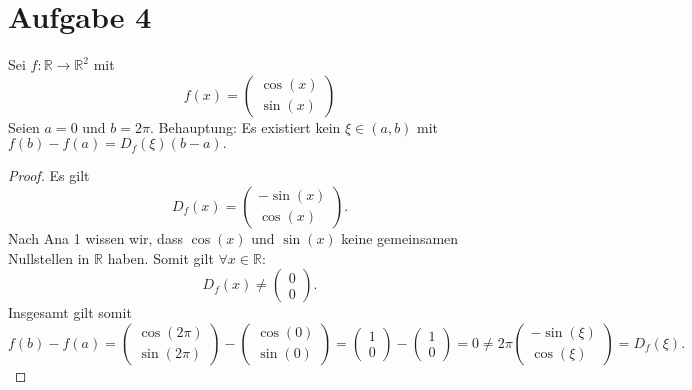 \documentclass{article}
\theoremstyle{definition}
\newcommand{\R}{\mathbb{R}}
\begin{document}
\section*{Aufgabe 4}
Sei $f:\R\longrightarrow \R^2$ mit 
$$f(x)=\begin{pmatrix}
	\cos(x)\\
	\sin(x)
\end{pmatrix}$$
Seien $a=0$ und $b=2\pi.$\newline
Behauptung: Es existiert kein $\xi \in (a,b)$ mit $f(b)-f(a)=D_f(\xi)(b-a).$
\begin{proof}
	Es gilt 
	$$ D_f(x)=\begin{pmatrix}
		-\sin(x)\\
		\cos(x)
	\end{pmatrix}.$$ Nach Ana 1 wissen wir, dass $\cos(x)$ und $\sin(x)$ keine gemeinsamen Nullstellen in $\R$ haben. Somit gilt $\forall x\in \R:$
	$$ D_f(x)\neq \begin{pmatrix}
		0\\
		0
	\end{pmatrix}.$$
	Insgesamt gilt somit 
	$$f(b)-f(a)=\begin{pmatrix}
		\cos(2\pi)\\
		\sin(2\pi)
	\end{pmatrix}-\begin{pmatrix}
		\cos(0)\\
		\sin(0)
	\end{pmatrix}=\begin{pmatrix}
		1\\
		0
	\end{pmatrix}-\begin{pmatrix}
		1\\
		0
	\end{pmatrix}
	=0\neq 2\pi\begin{pmatrix}
		-\sin(\xi)\\
		\cos(\xi)
	\end{pmatrix}=D_f(\xi).$$
\end{proof}
\end{document}
